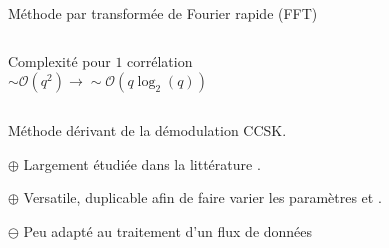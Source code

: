 \documentclass[../main.tex]{subfiles}
\begin{document}
\begin{frame}{Méthode par transformée de Fourier rapide (FFT)}{}
\begin{columns}
\begin{column}{.55\linewidth}
      {\scriptsize Complexité pour $1$ corrélation\\ $\sim \mathcal{O}(q^2) \rightarrow \sim \mathcal{O}(q \log_2(q))$}
    \end{column}
  \end{columns}


  \begin{columns}
    \begin{column}{.8\linewidth}
      Méthode dérivant de la démodulation CCSK.
      \begin{ctrlitemize}{0pt}
        \item [\textcolor{Chartreuse4}{$\bm{\oplus}$}] Largement étudiée dans la littérature \cite{abassiNonbinaryLowdensityParitycheck2013,kastnerParallelProgrammingFPGAs2018}.
        \item [\textcolor{Chartreuse4}{$\bm{\oplus}$}] Versatile, duplicable afin de faire varier les paramètres \textcolor{red}{\pd{}} et \textcolor{blue}{\po{}}.
        \item [\textcolor{Red3}{$\bm{\ominus}$}] Peu adapté au traitement d'un flux de données
      \end{ctrlitemize}
    \end{column}
  \end{columns}
\end{frame}
\end{document}
